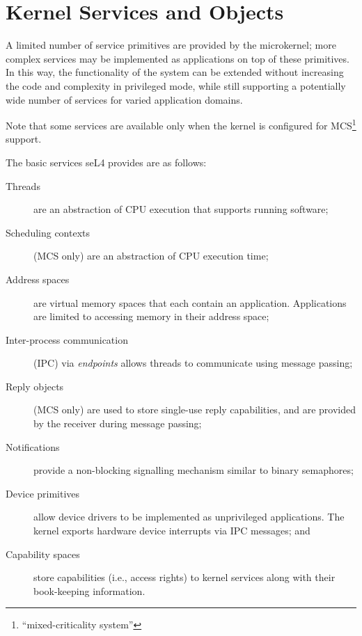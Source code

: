 %
%
%

\chapter{\label{ch:objects}Kernel Services and Objects}

A limited number of service primitives are provided by the microkernel;
more complex services may be implemented as applications on top of these
primitives. In this way, the functionality of the system can be extended
without increasing the code and complexity in privileged mode, while
still supporting a potentially wide number of services for varied
application domains.

Note that some services are available only when the kernel is configured for
MCS\footnote{``mixed-criticality system''} support.

The basic services seL4 provides are as follows:
\begin{description}
    \item[Threads] are an abstraction of CPU execution that supports
    running software;

    \item[Scheduling contexts] (MCS only) are an abstraction of CPU execution time;

    \item[Address spaces] are virtual memory spaces that each contain an
    application. Applications are limited to accessing memory in their
    address space;

    \item[Inter-process communication] (IPC) via \emph{endpoints} allows
    threads to communicate using message passing;

    \item[Reply objects] (MCS only) are used to store single-use reply capabilities,
    and are provided by the receiver during message passing;

    \item[Notifications] provide a non-blocking signalling mechanism
      similar to binary semaphores;

    \item[Device primitives] allow device drivers to be implemented as
    unprivileged applications.  The kernel exports hardware device
    interrupts via IPC messages; and

    \item[Capability spaces] store capabilities (i.e., access rights) to
    kernel services along with their book-keeping information.
\end{description}


